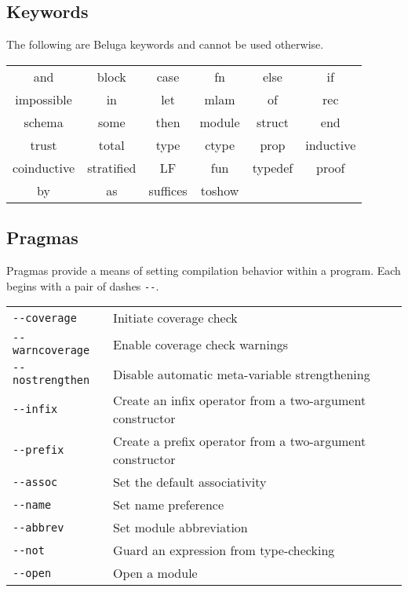 \documentclass[11pt]{article}
\begin{document}

\subsection{Keywords}
The following are Beluga keywords and cannot be used otherwise.
\begin{center}
\renewcommand{\arraystretch}{2}
\begin{tabular}{ c c c c c c }
    and         & block      & case     & fn     & else    & if        \\
    impossible  & in         & let      & mlam   & of      & rec       \\
    schema      & some       & then     & module & struct  & end       \\
    trust       & total      & type     & ctype  & prop    & inductive \\
    coinductive & stratified & LF       & fun    & typedef & proof     \\
    by          & as         & suffices & toshow &         &
\end{tabular}
\end{center}

\subsection{Pragmas}

Pragmas provide a means of setting compilation behavior within a program.
Each begins with a pair of dashes \verb+--+.

\begin{tabular}{ | l l}
    \verb+--coverage+     & Initiate coverage check                                  \\
    \verb+--warncoverage+ & Enable coverage check warnings                           \\
    \verb+--nostrengthen+ & Disable automatic meta-variable strengthening            \\
    \verb+--infix+        & Create an infix operator from a two-argument constructor \\
    \verb+--prefix+       & Create a prefix operator from a two-argument constructor \\
    \verb+--assoc+        & Set the default associativity                            \\
    \verb+--name+         & Set name preference                                      \\
    \verb+--abbrev+       & Set module abbreviation                                  \\
    \verb+--not+          & Guard an expression from type-checking                   \\
    \verb+--open+         & Open a module
\end{tabular}
\end{document}
